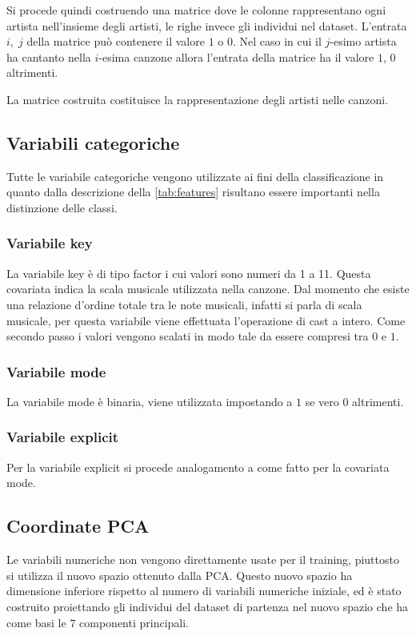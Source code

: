 Si procede quindi costruendo una matrice dove le colonne rappresentano ogni artista nell'insieme degli artisti, le righe invece gli individui nel dataset. L'entrata $i,\; j$ della matrice può contenere il valore $1$ o $0$. Nel caso in cui il $j$-esimo artista ha cantanto nella $i$-esima canzone allora l'entrata della matrice ha il valore $1$, $0$ altrimenti.

La matrice costruita costituisce la rappresentazione degli artisti nelle canzoni.

\subsection{Variabili categoriche}
Tutte le variabile categoriche vengono utilizzate ai fini della classificazione in quanto dalla descrizione della \autoref{tab:features} risultano essere importanti nella distinzione delle classi.

\subsubsection{Variabile key}
La variabile key è di tipo factor i cui valori sono numeri da 1 a 11. Questa covariata indica la scala musicale utilizzata nella canzone. Dal momento che esiste una relazione d'ordine totale tra le note musicali, infatti si parla di scala musicale, per questa variabile viene effettuata l'operazione di cast a intero. Come secondo passo i valori vengono scalati in modo tale da essere compresi tra $0$ e $1$.

\subsubsection{Variabile mode}
La variabile mode è binaria, viene utilizzata impostando a $1$ se vero $0$ altrimenti.
\subsubsection{Variabile explicit}
Per la variabile explicit si procede analogamento a come fatto per la covariata mode.

\subsection{Coordinate PCA}

Le variabili numeriche non vengono direttamente usate per il training, piuttosto si utilizza il nuovo spazio ottenuto dalla PCA. Questo nuovo spazio ha dimensione inferiore rispetto al numero di variabili numeriche iniziale, ed è stato costruito proiettando gli individui del dataset di partenza nel nuovo spazio che ha come basi le $7$ componenti principali.

